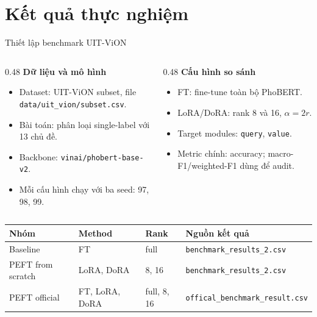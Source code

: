 \documentclass[11pt,aspectratio=169]{beamer}
\begin{document}
\section{Kết quả thực nghiệm}

\begin{frame}{Thiết lập benchmark UIT-ViON}
\footnotesize
\begin{columns}[T]
\begin{column}{0.48\textwidth}
\textbf{Dữ liệu và mô hình}
\begin{itemize}
  \item Dataset: UIT-ViON subset, file \texttt{data/uit\_vion/subset.csv}.
  \item Bài toán: phân loại single-label với 13 chủ đề.
  \item Backbone: \texttt{vinai/phobert-base-v2}.
  \item Mỗi cấu hình chạy với ba seed: 97, 98, 99.
\end{itemize}
\end{column}

\begin{column}{0.48\textwidth}
\textbf{Cấu hình so sánh}
\begin{itemize}
  \item FT: fine-tune toàn bộ PhoBERT.
  \item LoRA/DoRA: rank 8 và 16, $\alpha = 2r$.
  \item Target modules: \texttt{query}, \texttt{value}.
  \item Metric chính: accuracy; macro-F1/weighted-F1 dùng để audit.
\end{itemize}
\end{column}
\end{columns}

\vspace{0.25cm}
\centering
\scriptsize
\begin{tabular}{llll}
\toprule
Nhóm & Method & Rank & Nguồn kết quả \\
\midrule
Baseline & FT & full & \texttt{benchmark\_results\_2.csv} \\
PEFT from scratch & LoRA, DoRA & 8, 16 & \texttt{benchmark\_results\_2.csv} \\
PEFT official & FT, LoRA, DoRA & full, 8, 16 & \texttt{offical\_benchmark\_result.csv} \\
\bottomrule
\end{tabular}
\end{frame}
\end{document}
